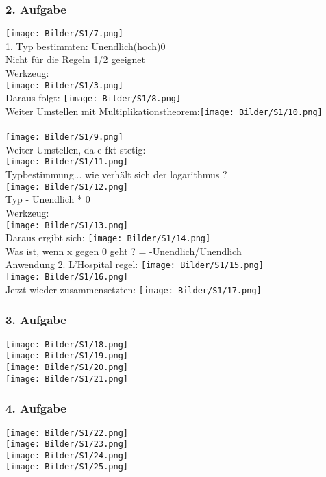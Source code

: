\documentclass[12pt,a4paper]{article}
\begin{document}
\subsubsection{2. Aufgabe}
\texttt{[image: Bilder/S1/7.png]}\\
1. Typ bestimmten: Unendlich(hoch)0\\
Nicht für die Regeln 1/2 geeignet\\
Werkzeug:\\
\texttt{[image: Bilder/S1/3.png]}\\
Daraus folgt:
\texttt{[image: Bilder/S1/8.png]}\\
Weiter Umstellen mit Multiplikationstheorem:\texttt{[image: Bilder/S1/10.png]}\\\\
\texttt{[image: Bilder/S1/9.png]}\\
Weiter Umstellen, da e-fkt stetig:\\
\texttt{[image: Bilder/S1/11.png]}\\
Typbestimmung... wie verhält sich der logarithmus ?\\
\texttt{[image: Bilder/S1/12.png]}\\
Typ - Unendlich * 0\\
\newpage
Werkzeug:\\
\texttt{[image: Bilder/S1/13.png]}\\
Daraus ergibt sich:
\texttt{[image: Bilder/S1/14.png]}\\
Was ist, wenn x gegen 0 geht ? = -Unendlich/Unendlich\\
Anwendung 2. L'Hospital regel:
\texttt{[image: Bilder/S1/15.png]}\\
\texttt{[image: Bilder/S1/16.png]}\\
Jetzt wieder zusammensetzten:
\texttt{[image: Bilder/S1/17.png]}\\
\subsubsection{3. Aufgabe}
\texttt{[image: Bilder/S1/18.png]}\\
\texttt{[image: Bilder/S1/19.png]}\\
\texttt{[image: Bilder/S1/20.png]}\\
\texttt{[image: Bilder/S1/21.png]}\\
\subsubsection{4. Aufgabe}
\texttt{[image: Bilder/S1/22.png]}\\
\texttt{[image: Bilder/S1/23.png]}\\
\texttt{[image: Bilder/S1/24.png]}\\
\texttt{[image: Bilder/S1/25.png]}\\
\end{document}
